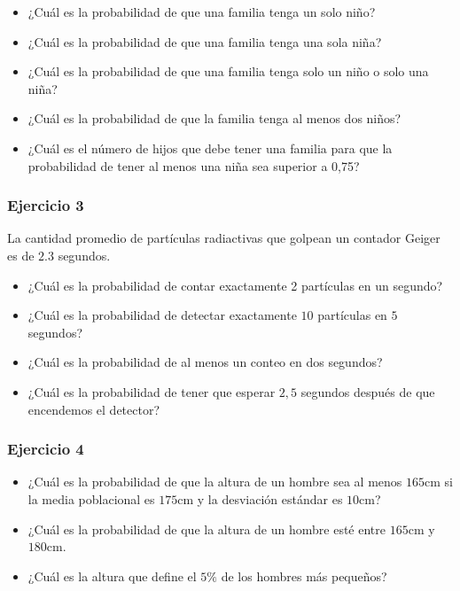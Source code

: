 \documentclass[
]{book}
\providecommand{\tightlist}{%
  \setlength{\itemsep}{0pt}\setlength{\parskip}{0pt}}
\begin{document}
\begin{itemize}
\tightlist
\item
  ¿Cuál es la probabilidad de que una familia tenga un solo niño?
\item
  ¿Cuál es la probabilidad de que una familia tenga una sola niña?
\item
  ¿Cuál es la probabilidad de que una familia tenga solo un niño o solo una niña?
\item
  ¿Cuál es la probabilidad de que la familia tenga al menos dos niños?
\item
  ¿Cuál es el número de hijos que debe tener una familia para que la probabilidad de tener al menos una niña sea superior a 0,75?
\end{itemize}

\hypertarget{ejercicio-3-2}{%
\subsubsection{Ejercicio 3}\label{ejercicio-3-2}}

La cantidad promedio de partículas radiactivas que golpean un contador Geiger es de \(2.3\) segundos.

\begin{itemize}
\item
  ¿Cuál es la probabilidad de contar exactamente 2 partículas en un segundo?
\item
  ¿Cuál es la probabilidad de detectar exactamente \(10\) partículas en \(5\) segundos?
\item
  ¿Cuál es la probabilidad de al menos un conteo en dos segundos?
\item
  ¿Cuál es la probabilidad de tener que esperar \(2,5\) segundos después de que encendemos el detector?
\end{itemize}

\hypertarget{ejercicio-4-2}{%
\subsubsection{Ejercicio 4}\label{ejercicio-4-2}}

\begin{itemize}
\item
  ¿Cuál es la probabilidad de que la altura de un hombre sea al menos
  \(165\)cm si la media poblacional es \(175\)cm y la desviación estándar es \(10\)cm?
\item
  ¿Cuál es la probabilidad de que la altura de un hombre esté entre
  \(165\)cm y \(180\)cm.
\item
  ¿Cuál es la altura que define el \(5\%\) de los hombres más pequeños?
\end{itemize}
\end{document}
